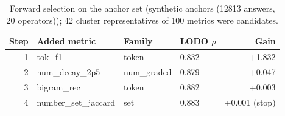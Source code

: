 \begin{table}[t]
\centering
\footnotesize
\caption{Forward selection on the anchor set (synthetic anchors (12813 answers, 20 operators)); 42 cluster representatives of 100 metrics were candidates.}
\label{tab:selected}

\begin{tabular}{rlllr}
\toprule
Step & Added metric & Family & LODO $\rho$ & Gain \\
\midrule
1 & tok\_f1 & token & 0.832 & +1.832 \\
2 & num\_decay\_2p5 & num\_graded & 0.879 & +0.047 \\
3 & bigram\_rec & token & 0.882 & +0.003 \\
4 & number\_set\_jaccard & set & 0.883 & +0.001 (stop) \\
\bottomrule
\end{tabular}

\end{table}